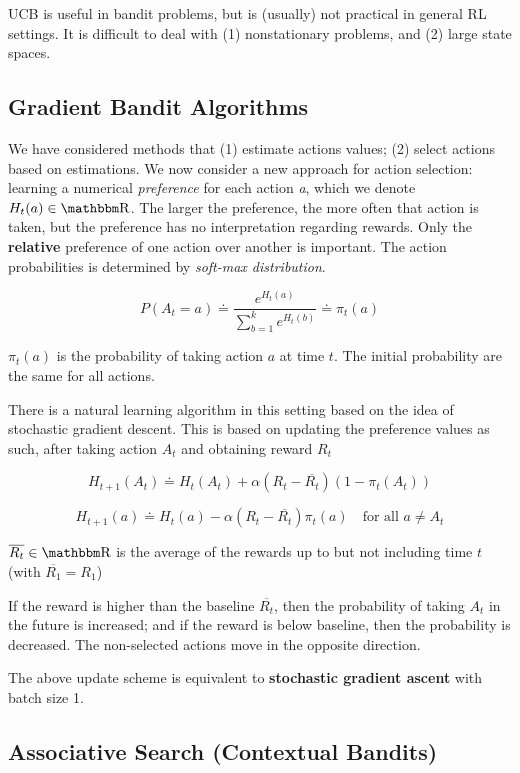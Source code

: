 \documentclass[sutton_barto_notes.tex]{subfiles}
\begin{document}
UCB is useful in bandit problems, but is (usually) not practical in general RL settings. It is difficult to deal with (1) nonstationary problems, and (2) large state spaces.

\subsection{Gradient Bandit Algorithms}
We have considered methods that (1) estimate actions values; (2) select actions based on estimations.
We now consider a new approach for action selection: learning a numerical \textit{preference} for each action \textit{a}, which we denote $H_t(a) \in \R$.
The larger the preference, the more often that action is taken, but the preference has no interpretation regarding rewards.
Only the \textbf{relative} preference of one action over another is important.
The action probabilities is determined by \textit{soft-max distribution}.

\[
P(A_t=a) \doteq \frac{e^{H_t(a)}}{\sum_{b=1}^k e^{H_t(b)}} \doteq \pi_t(a)
\]

$\pi_t(a)$ is the probability of taking action $a$ at time $t$. The initial probability are the same for all actions.

There is a natural learning algorithm in this setting based on the idea of stochastic gradient descent.
This is based on updating the preference values as such, after taking action $A_t$ and obtaining reward $R_t$

$$ H_{t+1}(A_t)\doteq H_t(A_t) + \alpha (R_t - \overline{R_t})(1-\pi_t(A_t)) $$

$$ H_{t+1}(a) \doteq H_t(a) - \alpha(R_t - \overline{R_t})\pi_t(a)\quad\text{for all }a\neq A_t $$

$\overline{R_t} \in \R $ is the average of the rewards up to but not including time $t$ (with $\overline{R_1} = R_1$)

If the reward is higher than the baseline $\overline{R_t}$, then the probability of taking $A_t$ in the future is increased; and if the reward is below baseline, then the probability is decreased.
The non-selected actions move in the opposite direction.

The above update scheme is equivalent to \textbf{stochastic gradient ascent} with batch size 1.

\subsection{Associative Search (Contextual Bandits)}
\end{document}
